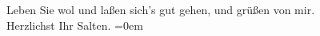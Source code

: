 \begin{ledgroupsized}[t]{13cm}
           \pstart
           Leben Sie wol und laßen sich’s gut gehen, und grüßen von mir. {\\[\baselineskip]}Herzlichst
               Ihr \spacefill\mbox{Salten.}\pend
           \leftskip=0em{}
         
         \endnumbering{}\end{ledgroupsized}  \newcommand{\dateiname}{L03314}\newcommand{\titel}{Felix Salten an Arthur Schnitzler, 2[3]. 6. 1901}\newcommand{\editorInnen}{Martin Anton Müller und Laura Untner}
      